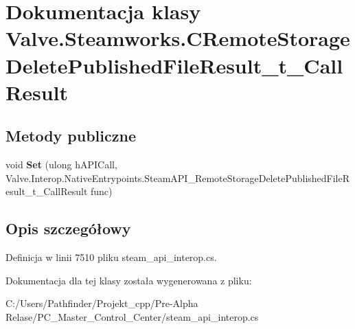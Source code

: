 \hypertarget{class_valve_1_1_steamworks_1_1_c_remote_storage_delete_published_file_result__t___call_result}{}\section{Dokumentacja klasy Valve.\+Steamworks.\+C\+Remote\+Storage\+Delete\+Published\+File\+Result\+\_\+t\+\_\+\+Call\+Result}
\label{class_valve_1_1_steamworks_1_1_c_remote_storage_delete_published_file_result__t___call_result}
\subsection*{Metody publiczne}
\begin{DoxyCompactItemize}
\item 
\mbox{\label{class_valve_1_1_steamworks_1_1_c_remote_storage_delete_published_file_result__t___call_result_aa46026b152e9262c64e8452cee7fd684}} 
void {\bfseries Set} (ulong h\+A\+P\+I\+Call, Valve.\+Interop.\+Native\+Entrypoints.\+Steam\+A\+P\+I\+\_\+\+Remote\+Storage\+Delete\+Published\+File\+Result\+\_\+t\+\_\+\+Call\+Result func)
\end{DoxyCompactItemize}


\subsection{Opis szczegółowy}


Definicja w linii 7510 pliku steam\+\_\+api\+\_\+interop.\+cs.



Dokumentacja dla tej klasy została wygenerowana z pliku\+:\begin{DoxyCompactItemize}
\item 
C\+:/\+Users/\+Pathfinder/\+Projekt\+\_\+cpp/\+Pre-\/\+Alpha Relase/\+P\+C\+\_\+\+Master\+\_\+\+Control\+\_\+\+Center/steam\+\_\+api\+\_\+interop.\+cs\end{DoxyCompactItemize}
